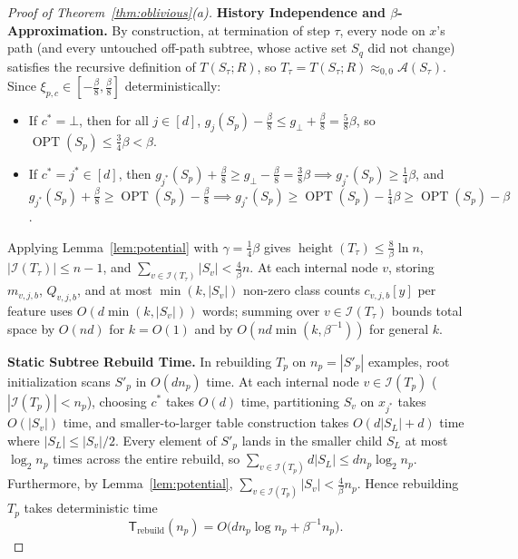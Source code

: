\documentclass[11pt]{article}
\theoremstyle{definition}
\newcommand{\calA}{\mathcal{A}}
\newcommand{\calI}{\mathcal{I}}
\newcommand{\OPT}{\operatorname{OPT}}
\begin{document}
\begin{proof}[Proof of Theorem~\ref{thm:oblivious}(a)]
\textbf{History Independence and $\beta$-Approximation.}
By construction, at termination of step $\tau$, every node on $x$'s path (and every untouched off-path subtree, whose active set $S_q$ did not change) satisfies the recursive definition of $T(S_\tau; R)$, so $T_\tau = T(S_\tau; R) \approx_{0,0} \calA(S_\tau)$. Since $\xi_{p, c} \in [-\frac{\beta}{8}, \frac{\beta}{8}]$ deterministically:
\begin{itemize}[leftmargin=1.5em,itemsep=1pt]
    \item If $c^* = \bot$, then for all $j \in [d]$, $g_j(S_p) - \frac{\beta}{8} \le g_\bot + \frac{\beta}{8} = \frac{5}{8}\beta$, so $\OPT(S_p) \le \frac{3}{4}\beta < \beta$.
    \item If $c^* = j^* \in [d]$, then $g_{j^*}(S_p) + \frac{\beta}{8} \ge g_\bot - \frac{\beta}{8} = \frac{3}{8}\beta \implies g_{j^*}(S_p) \ge \frac{1}{4}\beta$, and $g_{j^*}(S_p) + \frac{\beta}{8} \ge \OPT(S_p) - \frac{\beta}{8} \implies g_{j^*}(S_p) \ge \OPT(S_p) - \frac{1}{4}\beta \ge \OPT(S_p) - \beta$.
\end{itemize}
Applying Lemma~\ref{lem:potential} with $\gamma = \frac{1}{4}\beta$ gives $\operatorname{height}(T_\tau) \le \frac{8}{\beta}\ln n$, $|\calI(T_\tau)| \le n - 1$, and $\sum_{v \in \calI(T_\tau)} |S_v| < \frac{4}{\beta} n$. At each internal node $v$, storing $m_{v, j, b}$, $Q_{v, j, b}$, and at most $\min(k, |S_v|)$ non-zero class counts $c_{v, j, b}[y]$ per feature uses $O(d \min(k, |S_v|))$ words; summing over $v \in \calI(T_\tau)$ bounds total space by $O(nd)$ for $k = O(1)$ and by $O(nd \min(k, \beta^{-1}))$ for general $k$.

\textbf{Static Subtree Rebuild Time.}
In rebuilding $T_p$ on $n_p = |S'_p|$ examples, root initialization scans $S'_p$ in $O(d n_p)$ time. At each internal node $v \in \calI(T_p)$ ($|\calI(T_p)| < n_p$), choosing $c^*$ takes $O(d)$ time, partitioning $S_v$ on $x_{j^*}$ takes $O(|S_v|)$ time, and smaller-to-larger table construction takes $O(d|S_L| + d)$ time where $|S_L| \le |S_v|/2$. Every element of $S'_p$ lands in the smaller child $S_L$ at most $\log_2 n_p$ times across the entire rebuild, so $\sum_{v \in \calI(T_p)} d|S_L| \le d n_p \log_2 n_p$. Furthermore, by Lemma~\ref{lem:potential}, $\sum_{v \in \calI(T_p)} |S_v| < \frac{4}{\beta} n_p$. Hence rebuilding $T_p$ takes deterministic time
\[
    \mathsf{T}_{\mathrm{rebuild}}(n_p) = O\big(d n_p \log n_p + \beta^{-1} n_p\big).
\]


\end{proof}
\end{document}
